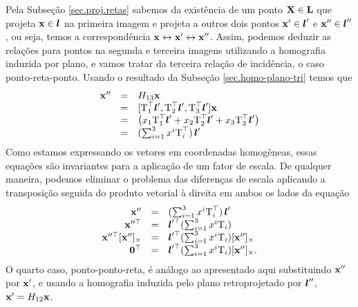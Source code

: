 Pela Subseção \ref{sec.proj.retas} sabemos da existência de um ponto $\mathbf{X}\in{\bf L}$ que projeta $\mathbf{x}\in\boldsymbol{l}$ na primeira imagem e projeta a outros dois pontos $\mathbf{x}'\in\boldsymbol{l}'$ e $\mathbf{x}''\in\boldsymbol{l}''$, ou seja, temos a correspondência $\mathbf{x}\leftrightarrow\mathbf{x}'\leftrightarrow\mathbf{x}''$. Assim, podemos deduzir as relações para 
pontos na segunda e terceira imagens utilizando a homografia induzida por plano, e vamos tratar da terceira relação de incidência, o caso ponto-reta-ponto. Usando o resultado da Subseção \ref{sec.homo-plano-tri} temos que 
\begin{equation*}
\begin{array}{rcl}
\mathbf{x}''&=&H_{13}\mathbf{x}\\
&=&[\mbox{T}_1^\top\boldsymbol{l}',\mbox{T}_2^\top\boldsymbol{l}',\mbox{T}_3^\top\boldsymbol{l}']\mathbf{x}\\
&=&
\begin{pmatrix}
x_1\mbox{T}_1^\top\boldsymbol{l}'+x_2\mbox{T}_2^\top\boldsymbol{l}'+x_3\mbox{T}_3^\top\boldsymbol{l}'
\end{pmatrix}\\
&=&(\sum_{i=1}^3 x^i\mbox{T}_i^\top)\,\boldsymbol{l}'
\end{array}
\end{equation*}
Como estamos expressando os vetores em coordenadas homogêneas, essas equações são invariantes para a aplicação de um fator de escala. De qualquer maneira, podemos eliminar o problema das diferenças de escala aplicando a transposição seguida do produto vetorial à direita em ambos os lados da equação
\begin{equation}\label{eq.ponto-reta-ponto}
\begin{array}{rcl}
\mathbf{x}''&=&(\sum_{i=1}^3 x^i\mbox{T}_i^\top)\,\boldsymbol{l}'\\
\mathbf{x}''^\top&=&\boldsymbol{l}'^\top(\sum_{i=1}^3 x^i\mbox{T}_i)\\
\mathbf{x}''^\top[\mathbf{x}'']_\times&=&\boldsymbol{l}'^\top(\sum_{i=1}^3 x^i\mbox{T}_i)[\mathbf{x}'']_\times\\
{\bf 0}^\top&=&\boldsymbol{l}'^\top(\sum_{i=1}^3 x^i\mbox{T}_i)[\mathbf{x}'']_\times.
\end{array}
\end{equation}
O quarto caso, ponto-ponto-reta, é análogo ao apresentado aqui substituindo $\mathbf{x}''$ por $\mathbf{x}'$, e usando a homografia induzida pelo plano retroprojetado por $\boldsymbol{l}''$, $\mathbf{x}'=H_{12}\mathbf{x}$.


